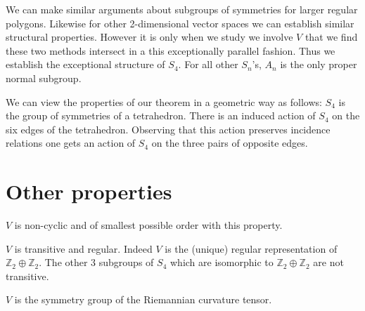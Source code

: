 \documentclass[12pt]{article}
\begin{document}
We can make similar arguments about subgroups of symmetries for 
larger regular polygons.  Likewise for other 2-dimensional vector spaces
we can establish similar structural properties.  However it is only
when we study we involve $V$ that we find these two methods intersect
in a this exceptionally parallel fashion.  Thus we establish the exceptional
structure of $S_4$.  For all other $S_n$'s, $A_n$ is the only proper normal
subgroup.

We can view the properties of our theorem in a geometric way as follows:
$S_4$ is the group of symmetries of a tetrahedron. There is an induced  action 
of  $S_4$ on the six edges of the tetrahedron. Observing that this action preserves incidence relations one gets an action of $S_4$ on the three pairs 
of opposite edges.

\section{Other properties}

$V$ is non-cyclic and of smallest possible order with this property.

$V$ is transitive and regular.  Indeed $V$ is the (unique) regular representation of 
$\mathbb{Z}_2\oplus \mathbb{Z}_2$.  The other 3 subgroups of $S_4$ which are isomorphic to 
$\mathbb{Z}_2\oplus \mathbb{Z}_2$ are not transitive.

$V$ is the symmetry group of the Riemannian curvature tensor.
\end{document}

